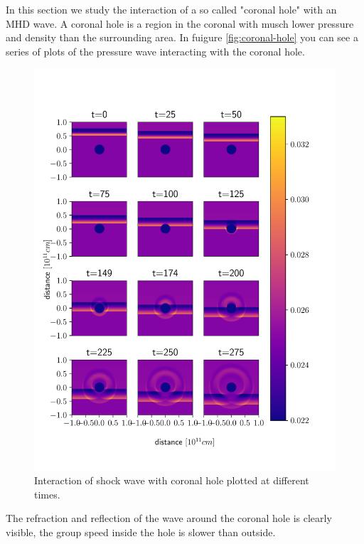 In this section we study the interaction of a so called "coronal hole" with an MHD wave. 
A coronal hole is a region in the coronal with musch lower pressure and density than the surrounding area.
In fuigure \autoref{fig:coronal-hole} you can see a series of plots of the pressure wave interacting with the coronal hole.

\begin{figure}[H]
	\centering
	\includegraphics[width=\linewidth]{images/coronal-hole.pdf}
	\caption{Interaction of shock wave with coronal hole plotted at different times.}
	\label{fig:coronal-hole}
\end{figure}

The refraction and reflection of the wave around the coronal hole is clearly visible, the group speed inside the hole is slower than outside.

